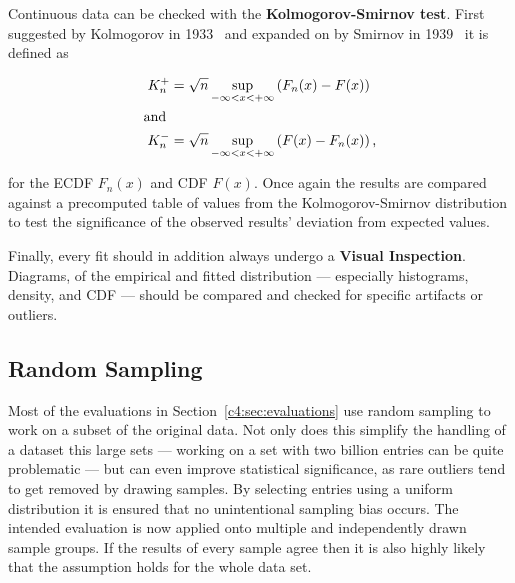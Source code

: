 Continuous data can be checked with the \textbf{Kolmogorov-Smirnov test}. First suggested by Kolmogorov in 1933~\cite{kolmogorov1933sulla} and expanded on by Smirnov in 1939~\cite{smirnov1939estimation} it is defined as

\begin{align}
	K_n^+ &= \sqrt{n} \sup_{-\infty < x < + \infty} \left( F_n(x) - F(x) \right) \\
	\shortintertext{and}
	\phantom{,}K_n^- &= \sqrt{n} \sup_{-\infty < x < + \infty} \left( F(x) - F_n(x) \right)\text{,}
\end{align}

for the \gls{ECDF} $F_n(x)$ and \gls{CDF} $F(x)$. Once again the results are compared against a precomputed table of values from the Kolmogorov-Smirnov distribution to test the significance of the observed results' deviation from expected values. 

Finally, every fit should in addition always undergo a \textbf{Visual Inspection}. Diagrams, of the empirical and fitted distribution --- especially histograms, density, and \gls{CDF} --- should be compared and checked for specific artifacts or outliers. 



\subsection{Random Sampling}

Most of the evaluations in Section~\ref{c4:sec:evaluations} use random sampling to work on a subset of the original data.  Not only does this simplify the handling of a dataset this large sets --- working on a set with two billion entries can be quite problematic --- but can even improve statistical significance, as rare outliers tend to get removed by drawing samples. By selecting entries using a uniform distribution it is ensured that no unintentional sampling bias occurs. The intended evaluation is now applied onto multiple and independently drawn sample groups. If the results of every sample agree then it is also highly likely that the assumption holds for the whole data set.






